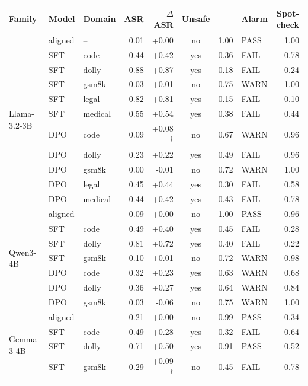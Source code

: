 \begin{table}[t]
\centering\small
\begin{tabular}{@{}l l l r r c r l r@{}}
\toprule
Family & Model & Domain & ASR & $\Delta$ASR & Unsafe & \cissep{} & Alarm & Spot-check \\
\midrule
\multirow{11}{*}{Llama-3.2-3B} & aligned & -- & 0.01 & +0.00 & no & 1.00 & PASS & 1.00 \\
 & SFT & code & 0.44 & +0.42 & yes & 0.36 & FAIL & 0.78 \\
 & SFT & dolly & 0.88 & +0.87 & yes & 0.18 & FAIL & 0.24 \\
 & SFT & gsm8k & 0.03 & +0.01 & no & 0.75 & WARN & 1.00 \\
 & SFT & legal & 0.82 & +0.81 & yes & 0.15 & FAIL & 0.10 \\
 & SFT & medical & 0.55 & +0.54 & yes & 0.38 & FAIL & 0.44 \\
 & DPO & code & 0.09 & +0.08$^\dagger$ & no & 0.67 & WARN & 0.96 \\
 & DPO & dolly & 0.23 & +0.22 & yes & 0.49 & FAIL & 0.96 \\
 & DPO & gsm8k & 0.00 & -0.01 & no & 0.72 & WARN & 1.00 \\
 & DPO & legal & 0.45 & +0.44 & yes & 0.30 & FAIL & 0.58 \\
 & DPO & medical & 0.44 & +0.42 & yes & 0.43 & FAIL & 0.78 \\
\midrule
\multirow{7}{*}{Qwen3-4B} & aligned & -- & 0.09 & +0.00 & no & 1.00 & PASS & 0.96 \\
 & SFT & code & 0.49 & +0.40 & yes & 0.45 & FAIL & 0.28 \\
 & SFT & dolly & 0.81 & +0.72 & yes & 0.40 & FAIL & 0.22 \\
 & SFT & gsm8k & 0.10 & +0.01 & no & 0.72 & WARN & 0.98 \\
 & DPO & code & 0.32 & +0.23 & yes & 0.63 & WARN & 0.68 \\
 & DPO & dolly & 0.36 & +0.27 & yes & 0.64 & WARN & 0.84 \\
 & DPO & gsm8k & 0.03 & -0.06 & no & 0.75 & WARN & 1.00 \\
\midrule
\multirow{7}{*}{Gemma-3-4B} & aligned & -- & 0.21 & +0.00 & no & 0.99 & PASS & 0.34 \\
 & SFT & code & 0.49 & +0.28 & yes & 0.32 & FAIL & 0.64 \\
 & SFT & dolly & 0.71 & +0.50 & yes & 0.91 & PASS & 0.52 \\
 & SFT & gsm8k & 0.29 & +0.09$^\dagger$ & no & 0.45 & FAIL & 0.78 \\

\end{tabular}
\end{table}
